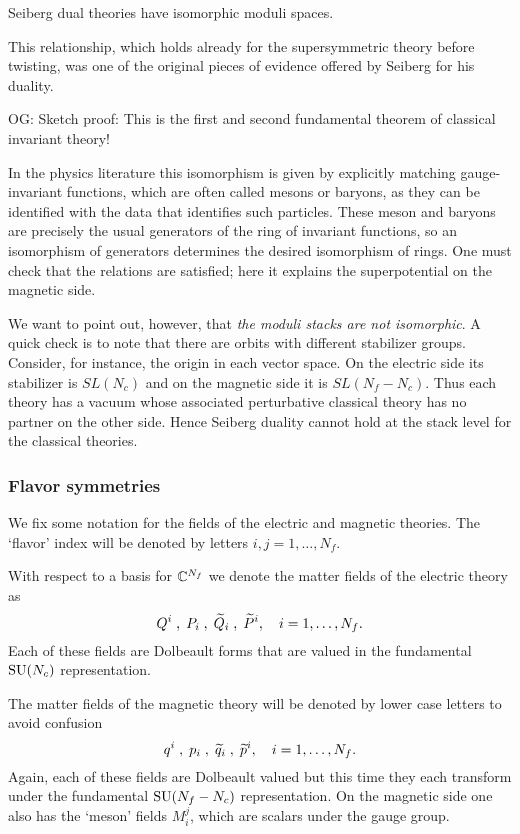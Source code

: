 \documentclass[11pt]{amsart}
\def\SU{{\rm SU}}
\def\owen#1{{\textcolor{violet!65!black}{OG: {#1}}}}
\begin{document}
\begin{prop}
Seiberg dual theories have isomorphic moduli spaces.
\end{prop}

This relationship, which holds already for the supersymmetric theory before twisting, was one of the original pieces of evidence offered by Seiberg for his duality.

\owen{Sketch proof}: This is the first and second fundamental theorem of classical invariant theory!

\begin{rmk}
In the physics literature this isomorphism is given by explicitly matching gauge-invariant functions, which are often called mesons or baryons, as they can be identified with the data that identifies such particles.
These meson and baryons are precisely the usual generators of the ring of invariant functions, so an isomorphism of generators determines the desired isomorphism of rings. 
One must check that the relations are satisfied;
here it explains the superpotential on the magnetic side.
\end{rmk}

We want to point out, however, that {\em the moduli stacks are not isomorphic}.
A quick check is to note that there are orbits with different stabilizer groups.
Consider, for instance, the origin in each vector space.
On the electric side its stabilizer is $SL(N_c)$ and on the magnetic side it is $SL(N_f - N_c)$.
Thus each theory has a vacuum whose associated perturbative classical theory has no partner on the other side.
Hence Seiberg duality cannot hold at the stack level for the classical theories.

\subsubsection{Flavor symmetries}

We fix some notation for the fields of the electric and magnetic theories. 
The `flavor' index will be denoted by letters $i,j=1,\ldots, N_f$. 

With respect to a basis for $\CC^{N_f}$ we denote the matter fields of the electric theory as
\[
Q^i\; , \; P_i \; , \; \Tilde{Q}_i \; , \; \Tilde{P}^i , \quad i = 1, \ldots, N_f.
\]
Each of these fields are Dolbeault forms that are valued in the fundamental $\SU(N_c)$ representation. 

The matter fields of the magnetic theory will be denoted by lower case letters to avoid confusion
\[
q^i\; , \; p_i \; , \; \Tilde{q}_i \; , \; \Tilde{p}^i , \quad i = 1, \ldots, N_f.
\]
Again, each of these fields are Dolbeault valued but this time they each transform under the fundamental $\SU(N_f-N_c)$ representation. 
On the magnetic side one also has the `meson' fields $M_{i}^j$, which are scalars under the gauge group.
\end{document}
